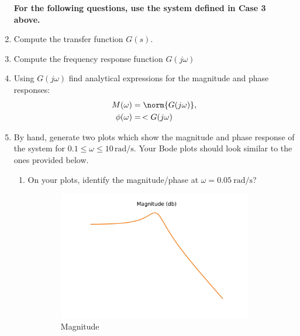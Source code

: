 \documentclass[11pt, reqno]{article}    %
\begin{document}
\begin{enumerate}
\begin{enumerate}
    \end{enumerate}
    \textbf{For the following questions, use the system defined in Case 3 above.}
    \item Compute the transfer function \( G(s) \). 
    \item Compute the frequency response function \( G(j \omega)\)
    \item Using \( G(j \omega) \) find analytical expressions for the magnitude and phase responses:
    \begin{align*}
        M(\omega) &= \norm{G(j \omega)}, \\
        \phi(\omega) &=\, < G(j \omega)
    \end{align*}
    \item By hand, generate two plots which show the magnitude and phase response of the system for \( 0.1 \leq \omega \leq 10 \, \si{\radian\per\second}\). 
    Your Bode plots should look similar to the ones provided below.
    \begin{enumerate}
        \item On your plots, identify the magnitude/phase at \( \omega = \SI{0.05}{\radian\per\second}\)?
    \end{enumerate}
        \begin{figure}[htbp] 
        \centering 
        \begin{subfigure}[htbp]{0.5\textwidth} 
            \includegraphics[width=\textwidth]{mag.pdf} 
            \caption{Magnitude} 
        \end{subfigure}~ 
        \begin{subfigure}[htbp]{0.5\textwidth} 

\end{subfigure}
\end{figure}
\end{enumerate}
\end{document}

